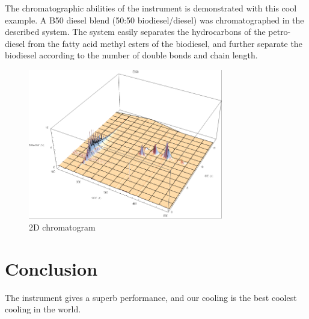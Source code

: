 \documentclass[aip,rsi,preprint,graphicx]{revtex4-1} %
\begin{document}
The chromatographic abilities of the instrument is demonstrated with this cool example. A B50 diesel blend (50:50 biodiesel/diesel) was chromatographed in the described system. The system easily separates the hydrocarbons of the petro-diesel from the fatty acid methyl esters of the biodiesel, and further separate the biodiesel according to the number of double bonds and chain length. 

\begin{figure}
\includegraphics[width=8.5cm]{2DChromatogram_2013_11_29}%
\caption{\label{fig:2DChromatogram}2D chromatogram }%
\end{figure}


\section{Conclusion}

The instrument gives a superb performance, and our cooling is the best coolest cooling in the world. 
\

%
%
\end{document}
